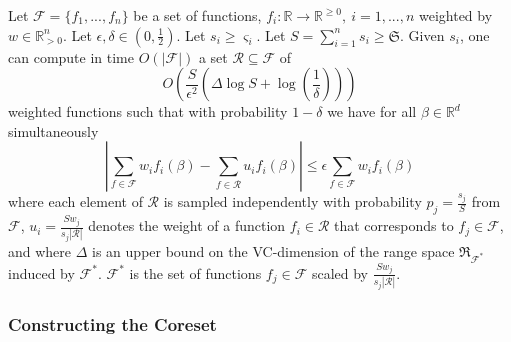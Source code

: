 \begin{theorem}
    Let $\mathcal{F} = \{ f_1, ..., f_n \}$ be a set of functions,
    $f_i: \mathbb{R} \rightarrow \mathbb{R}^{\geq 0}, \ i=1,...,n$ weighted by
    $w \in \mathbb{R}^n_{>0}$.
    Let $\epsilon, \delta \in (0, \frac{1}{2})$.
    Let $s_i \geq \varsigma_i$.
    Let $S = \sum_{i=1}^n s_i \geq \mathfrak{S}$.
    Given $s_i$, one can compute in time $O(|\mathcal{F}|)$ a set
    $\mathcal{R} \subseteq \mathcal{F}$ of
    \begin{equation*}
        O \left( \frac{S}{\epsilon^2} \left( \Delta \log S + \log \left( \frac{1}{\delta} \right) \right) \right)
    \end{equation*}
    weighted functions such that with probability $1 - \delta$ we have
    for all $\beta \in \mathbb{R}^d$ simultaneously
    \begin{equation*}
        \left| \sum_{f \in \mathcal{F}} w_i f_i(\beta) - \sum_{f \in \mathcal{R}} u_i f_i(\beta) \right| \leq \epsilon \sum_{f \in \mathcal{F}} w_i f_i(\beta)
    \end{equation*}
    where each element of $\mathcal{R}$ is sampled independently with probability
    $p_j = \frac{s_j}{S}$ from $\mathcal{F}$, $u_i = \frac{S w_j}{s_j |\mathcal{R}|}$
    denotes the weight of a function $f_i \in \mathcal{R}$ that corresponds to
    $f_j \in \mathcal{F}$, and where $\Delta$ is an upper bound on the
    VC-dimension of the range space $\mathfrak{R}_{\mathcal{F}^*}$ induced by
    $\mathcal{F}^*$. $\mathcal{F}^*$ is the set of functions $f_j \in \mathcal{F}$
    scaled by $\frac{S w_j}{s_j |\mathcal{R}|}$.
\end{theorem}

\subsubsection{Constructing the Coreset}
